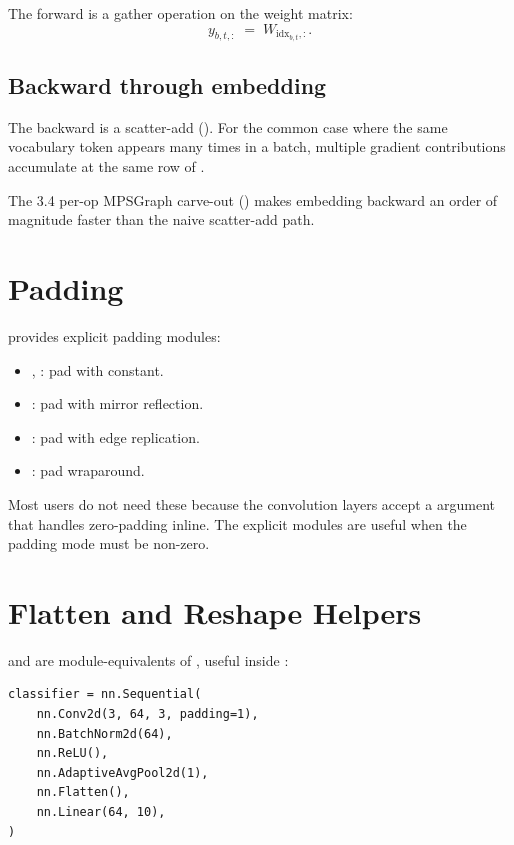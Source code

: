 The forward is a gather operation on the weight matrix:
\[
y_{b, t, :} \;=\; W_{\text{idx}_{b, t}, :}.
\]

\subsection{Backward through embedding}
\label{ssec:linear_conv_norm:embedding_backward}

The backward is a scatter-add (). For the
common case where the same vocabulary token appears many times in
a batch, multiple gradient contributions accumulate at the same
row of .

The 3.4 per-op MPSGraph carve-out
() makes embedding backward an order
of magnitude faster than the naive scatter-add path.

\section{Padding}
\label{sec:linear_conv_norm:padding}

 provides explicit padding modules:
\begin{itemize}
  \item {}, : pad with constant.
  \item {}: pad with mirror reflection.
  \item {}: pad with edge replication.
  \item {}: pad wraparound.
\end{itemize}

Most users do not need these because the convolution layers
accept a  argument that handles zero-padding
inline. The explicit modules are useful when the padding mode
must be non-zero.

\section{Flatten and Reshape Helpers}
\label{sec:linear_conv_norm:flatten}

 and  are module-equivalents of
, useful inside :

\begin{lstlisting}[style=lucid,language=LucidPython]
classifier = nn.Sequential(
    nn.Conv2d(3, 64, 3, padding=1),
    nn.BatchNorm2d(64),
    nn.ReLU(),
    nn.AdaptiveAvgPool2d(1),
    nn.Flatten(),
    nn.Linear(64, 10),
)
\end{lstlisting}

